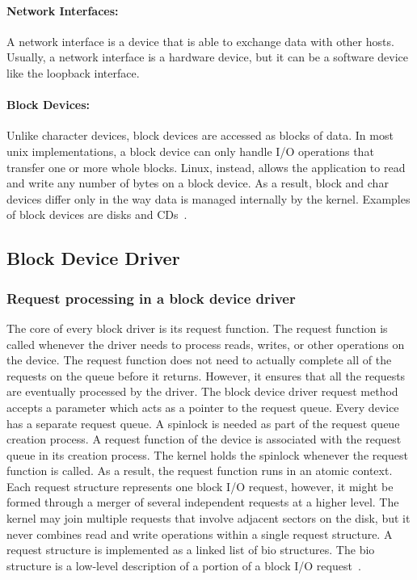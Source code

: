\paragraph{Network Interfaces:} A network interface is a device that is able to exchange data with other hosts. Usually, a network interface is a hardware device, but it can be a software device like the loopback interface. 

\paragraph{Block Devices:} Unlike character devices, block devices are accessed as blocks of data. In most unix implementations, a block device can only handle I/O operations that transfer one or more whole blocks. Linux, instead, allows the application to read and write any number of bytes on a block device. As a result, block and char devices differ only in the way data is managed internally by the kernel. Examples of block devices are disks and CDs~\cite{Corbet:2005:LDD:1209083}.

\subsection*{Block Device Driver}
\subsubsection*{Request processing in a block device driver}
\label{subsec:request queue}
The core of every block driver is its request function. The request function is called whenever the driver needs to process reads, writes, or other operations on the device. The request function does not need to actually complete all of the requests on the queue before it returns. However, it ensures that all the requests are eventually processed by the driver. The block device driver request method accepts a parameter which acts as a pointer to the request queue. Every device has a separate request queue. A spinlock is needed as part of the request queue creation process. A request function of the device is associated with the request queue in its creation process. The kernel holds the spinlock whenever the request function is called. As a result, the request function runs in an atomic context.
\\[3mm]
Each request structure represents one block I/O request, however, it might be formed through a merger of several independent requests at a higher level.
The kernel may join multiple requests that involve adjacent sectors on the disk, but it never combines read and write operations within a single request structure. A request structure is implemented as a linked list of bio structures. The bio structure is a low-level description of a portion of a block I/O request~\cite{Corbet:2005:LDD:1209083}.

